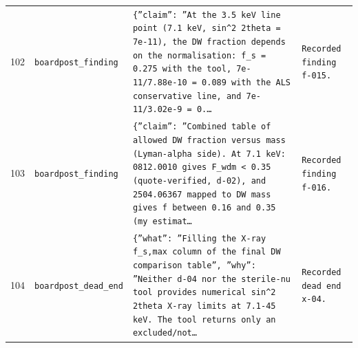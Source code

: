 \documentclass[11pt,a4paper]{article}
\begin{document}
\begin{longtable}{@{}p{}p{}p{}p{}@{}}
102 & \texttt{board}\newline\texttt{post\_\allowbreak{}finding} & \texttt{\{''claim'':\allowbreak{} ''At the 3.5 keV line point (7.1 keV,\allowbreak{} sin\textasciicircum{}\allowbreak{}2 2theta =\allowbreak{} 7e-11)\allowbreak{},\allowbreak{} the DW fraction depends on the normalisation:\allowbreak{} f\_\allowbreak{}s =\allowbreak{} 0.275 with the tool,\allowbreak{} 7e-11/\allowbreak{}7.88e-10 =\allowbreak{} 0.089 with the ALS conservative line,\allowbreak{} and 7e-11/\allowbreak{}3.02e-9 =\allowbreak{} 0.\ldots{}\allowbreak{}} & \texttt{Recorded finding f-015.} \\
103 & \texttt{board}\newline\texttt{post\_\allowbreak{}finding} & \texttt{\{''claim'':\allowbreak{} ''Combined table of allowed DW fraction versus mass (Lyman-alpha side)\allowbreak{}. At 7.1 keV:\allowbreak{} 0812.0010 gives F\_\allowbreak{}wdm \textless{}\allowbreak{} 0.35 (quote-verified,\allowbreak{} d-02)\allowbreak{},\allowbreak{} and 2504.06367 mapped to DW mass gives f between 0.16 and 0.35 (my estimat\ldots{}\allowbreak{}} & \texttt{Recorded finding f-016.} \\
104 & \texttt{board}\newline\texttt{post\_\allowbreak{}dead\_\allowbreak{}end} & \texttt{\{''what'':\allowbreak{} ''Filling the X-ray f\_\allowbreak{}s,\allowbreak{}max column of the final DW comparison table'',\allowbreak{} ''why'':\allowbreak{} ''Neither d-04 nor the sterile-nu tool provides numerical sin\textasciicircum{}\allowbreak{}2 2theta X-ray limits at 7.1-45 keV. The tool returns only an excluded/\allowbreak{}not\ldots{}\allowbreak{}} & \texttt{Recorded dead end x-04.} \\
\bottomrule\end{longtable}
\end{document}
